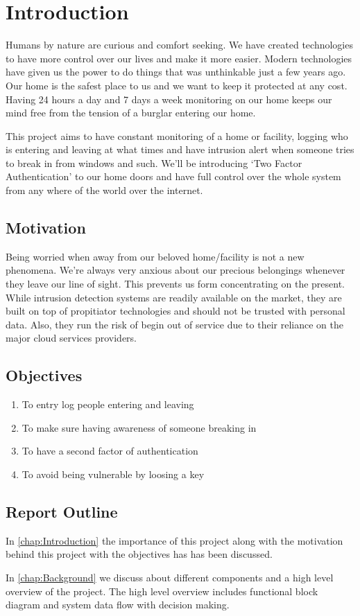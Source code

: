 \chapter{Introduction}
\label{chap:Introduction}
Humans by nature are curious and comfort seeking. We have created technologies to have more control over our lives and 
make it more easier. Modern technologies have given us the power to do things that was unthinkable just a few years ago. 
Our home is the safest place to us and we want to keep it protected at any cost. Having 24 hours a day and 7 days a week 
monitoring on our home keeps our mind free from the tension of a burglar entering our home. 

This project aims to have constant monitoring of a home or facility, logging who is entering and leaving at what times
and have intrusion alert when someone tries to break in from windows and such. We'll be introducing `Two Factor Authentication'
to our home doors and have full control over the whole system from any where of the world over the internet. 

\section{Motivation}
Being worried when away from our beloved home/facility is not a new phenomena. We're always very anxious about our 
precious belongings whenever they leave our line of sight. This prevents us form concentrating on the present. While intrusion
detection systems are readily available on the market, they are built on top of propitiator technologies and should not be 
trusted with personal data. Also, they run the risk of begin out of service due to their reliance on the major cloud services 
providers. 

\section{Objectives}
\begin{enumerate}
    \item To entry log people entering and leaving
    \item To make sure having awareness of someone breaking in 
    \item To have a second factor of authentication
    \item To avoid being vulnerable by loosing a key
\end{enumerate}

\section{Report Outline}
In \autoref{chap:Introduction} the importance of this project along with the motivation behind this project with the objectives has 
has been discussed.

In \autoref{chap:Background} we discuss about different components and a high level overview of the project. The high level overview
includes functional block diagram and system data flow with decision making. 